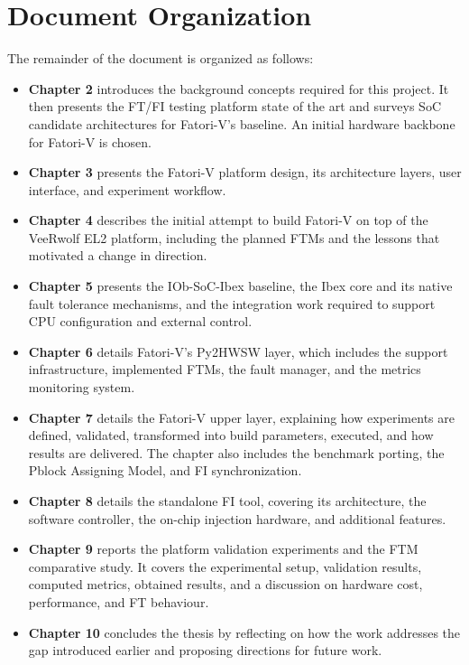 \section{Document Organization}
The remainder of the document is organized as follows:
\begin{itemize}
    \item \textbf{Chapter 2} introduces the background concepts required for this project. It then presents the \ac{FT}/\ac{FI} testing platform state of the art and surveys \ac{SoC} candidate architectures for \ac{Fatori-V}'s baseline. An initial hardware backbone for \ac{Fatori-V} is chosen.

    \item \textbf{Chapter 3} presents the \ac{Fatori-V} platform design, its architecture layers, user interface, and experiment workflow.

    \item \textbf{Chapter 4} describes the initial attempt to build \ac{Fatori-V} on top of the VeeRwolf EL2 platform, including the planned \acp{FTM} and the lessons that motivated a change in direction.

    \item \textbf{Chapter 5} presents the IOb-SoC-Ibex baseline, the Ibex core and its native fault tolerance mechanisms, and the integration work required to support \ac{CPU} configuration and external control.

    \item \textbf{Chapter 6} details \ac{Fatori-V}'s Py2HWSW layer, which includes the support infrastructure, implemented \acp{FTM}, the fault manager, and the metrics monitoring system.

    \item \textbf{Chapter 7} details the \ac{Fatori-V} upper layer, explaining how experiments are defined, validated, transformed into build parameters, executed, and how results are delivered. The chapter also includes the benchmark porting, the Pblock Assigning Model, and \ac{FI} synchronization.

    \item \textbf{Chapter 8} details the standalone \ac{FI} tool, covering its architecture, the software controller, the on-chip injection hardware, and additional features.

    \item \textbf{Chapter 9} reports the platform validation experiments and the \ac{FTM} comparative study. It covers the experimental setup, validation results, computed metrics, obtained results, and a discussion on hardware cost, performance, and \ac{FT} behaviour.

    \item \textbf{Chapter 10} concludes the thesis by reflecting on how the work addresses the gap introduced earlier and proposing directions for future work.
\end{itemize}